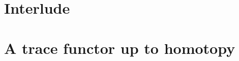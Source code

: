 \documentclass[12pt]{nuthesis} %
\theoremstyle{definition}
\theoremstyle{remark}
\theoremstyle{example}
\begin{document}
\chapter{Interlude}
	
	

\chapter{A trace functor up to homotopy}
	
	
	
	

\begin{singlespace}
\clearpage{} %

\end{singlespace}

\appendix		%



\end{document}
